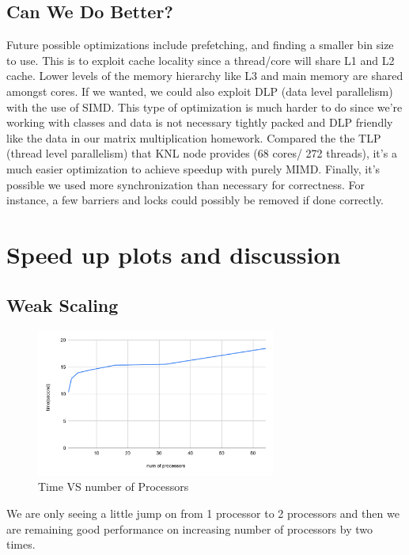 \documentclass{article}
\begin{document}
\subsection{Can We Do Better?}
Future possible optimizations include prefetching, and finding a smaller bin size to use. This is to exploit cache locality since a thread/core will share L1 and L2 cache. Lower levels of the memory hierarchy like L3 and main memory are shared amongst cores. If we wanted, we could also exploit DLP (data level parallelism) with the use of SIMD. This type of optimization is much harder to do since we're working with classes and data is not necessary tightly packed and DLP friendly like the data in our matrix multiplication homework. Compared the the TLP (thread level parallelism) that KNL node provides (68 cores/ 272 threads), it's a much easier optimization to achieve speedup with purely MIMD. Finally, it's possible we used more synchronization than necessary for correctness. For instance, a few barriers and locks
could possibly be removed if done correctly.

\section{Speed up plots and discussion}
\subsection{Weak Scaling}
\begin{figure}[H] %
\centering %
\includegraphics[width=0.7\textwidth]{figures/time_vs_num_processor_weak.pdf} %
\caption{Time VS number of Processors} %
\label{Time VS number of Processors} %
\end{figure}

We are only seeing a little jump on from 1 processor to 2 processors and then we are remaining good performance on increasing number of processors by two times.
\end{document}
